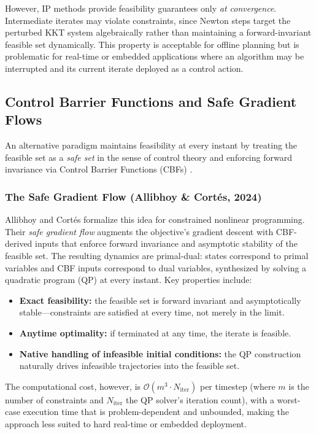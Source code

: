 \documentclass[11pt,onecolumn]{article}
\theoremstyle{definition}
\theoremstyle{remark}
\begin{document}
However, IP methods provide feasibility guarantees only \emph{at convergence}. Intermediate iterates may violate constraints, since Newton steps target the perturbed KKT system algebraically rather than maintaining a forward-invariant feasible set dynamically. This property is acceptable for offline planning but is problematic for real-time or embedded applications where an algorithm may be interrupted and its current iterate deployed as a control action.

\subsection{Control Barrier Functions and Safe Gradient Flows}

An alternative paradigm maintains feasibility at every instant by treating the feasible set as a \emph{safe set} in the sense of control theory and enforcing forward invariance via Control Barrier Functions (CBFs) \cite{ames2019cbf,ames2017cbf}.

\subsubsection{The Safe Gradient Flow (Allibhoy \& Cort\'{e}s, 2024)}

Allibhoy and Cort\'{e}s \cite{allibhoy2024} formalize this idea for constrained nonlinear programming. Their \emph{safe gradient flow} augments the objective's gradient descent with CBF-derived inputs that enforce forward invariance and asymptotic stability of the feasible set. The resulting dynamics are primal-dual: states correspond to primal variables and CBF inputs correspond to dual variables, synthesized by solving a quadratic program (QP) at every instant. Key properties include:
\begin{itemize}
    \item \textbf{Exact feasibility:} the feasible set is forward invariant and asymptotically stable---constraints are satisfied at every time, not merely in the limit.
    \item \textbf{Anytime optimality:} if terminated at any time, the iterate is feasible.
    \item \textbf{Native handling of infeasible initial conditions:} the QP construction naturally drives infeasible trajectories into the feasible set.
\end{itemize}
The computational cost, however, is $\mathcal{O}(m^3 \cdot N_{\text{iter}})$ per timestep (where $m$ is the number of constraints and $N_{\text{iter}}$ the QP solver's iteration count), with a worst-case execution time that is problem-dependent and unbounded, making the approach less suited to hard real-time or embedded deployment.
\end{document}
